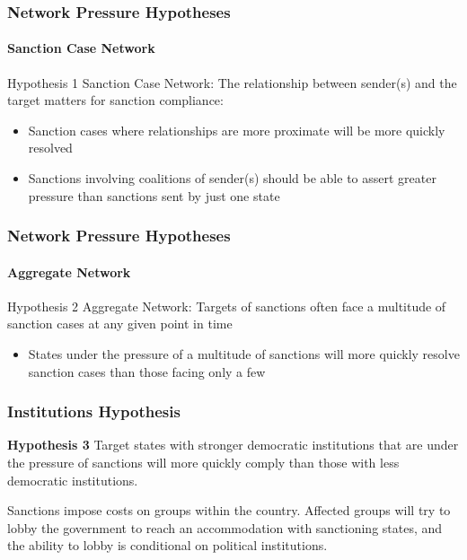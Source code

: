 \documentclass{beamer}
\begin{document}

\begin{frame}
\frametitle{Network Pressure Hypotheses}
\framesubtitle{Sanction Case Network}

\begin{block}{Hypothesis 1}
	Sanction Case Network: The relationship between sender(s) and the target matters for sanction compliance: 
\end{block}

\begin{itemize}
	\item Sanction cases where relationships are more proximate will be more quickly resolved
	\item Sanctions involving coalitions of sender(s) should be able to assert greater pressure than sanctions sent by just one state
\end{itemize}

\end{frame}

\begin{frame}
\frametitle{Network Pressure Hypotheses}
\framesubtitle{Aggregate Network}

\begin{block}{Hypothesis 2}
	Aggregate Network: Targets of sanctions often face a multitude of sanction cases at any given point in time
\end{block}

\begin{itemize}
	\item States under the pressure of a multitude of sanctions will more quickly resolve sanction cases than those facing only a few
\end{itemize}

\end{frame}

\begin{frame}
\frametitle{Institutions Hypothesis}

\begin{block}{\textbf{Hypothesis 3}}
	Target states with stronger democratic institutions that are under the pressure of sanctions will more quickly comply than those with less democratic institutions. 
\end{block}

Sanctions impose costs on groups within the country. Affected groups will try to lobby the government to reach an accommodation with sanctioning states, and the ability to lobby is conditional on political institutions.

\end{frame}
\end{document}
